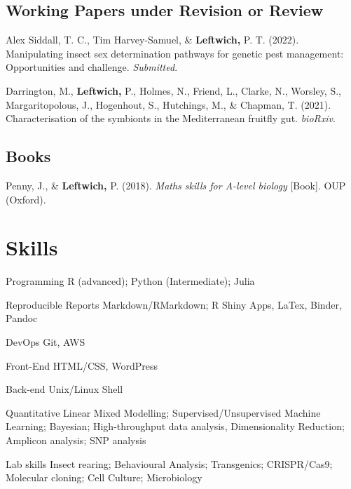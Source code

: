 \documentclass[11pt, a4paper]{awesome-cv}
\begin{document}
\hypertarget{working-papers-under-revision-or-review}{%
\subsection{Working Papers under Revision or
Review}\label{working-papers-under-revision-or-review}}

\begingroup
\setlength{\parindent}{0.2in}

\hypertarget{refs_working_paper}{}
\leavevmode\hypertarget{ref-2}{}%
Alex Siddall, T. C., Tim Harvey-Samuel, \& \textbf{Leftwich,} P. T.
(2022). Manipulating insect sex determination pathways for genetic pest
management: Opportunities and challenge. \emph{Submitted}.

\leavevmode\hypertarget{ref-1}{}%
Darrington, M., \textbf{Leftwich,} P., Holmes, N., Friend, L., Clarke,
N., Worsley, S., Margaritopolous, J., Hogenhout, S., Hutchings, M., \&
Chapman, T. (2021). Characterisation of the symbionts in the
{Mediterranean} fruitfly gut. \emph{bioRxiv}.

\endgroup

\hypertarget{books}{%
\subsection{Books}\label{books}}

\begingroup
\setlength{\parindent}{0.2in}

\hypertarget{refs_proceedings}{}
\leavevmode\hypertarget{ref-1}{}%
Penny, J., \& \textbf{Leftwich,} P. (2018). \emph{Maths skills for
{A-level} biology} {[}Book{]}. OUP (Oxford).

\endgroup

\hypertarget{skills}{%
\section{Skills}\label{skills}}

\begin{cvskills}
  \cvskill
    {Programming}
    {R (advanced); Python (Intermediate); Julia}
    
  \cvskill
    {Reproducible Reports}
    {Markdown/RMarkdown; R Shiny Apps, LaTex, Binder, Pandoc}
   
  \cvskill
    {DevOps}
    {Git, AWS}  
    
  \cvskill
    {Front-End}
    {HTML/CSS, WordPress} 
    
  \cvskill
    {Back-end}
    {Unix/Linux Shell}
    
  \cvskill
    {Quantitative}
    {Linear Mixed Modelling; Supervised/Unsupervised Machine Learning; Bayesian; \newline High-throughput data analysis, Dimensionality Reduction; Amplicon analysis; SNP analysis}
    
  \cvskill
    {Lab skills}
    {Insect rearing; Behavioural Analysis; Transgenics; CRISPR/Cas9; Molecular cloning; \newline Cell Culture; Microbiology}
    
\end{cvskills}
\end{document}
